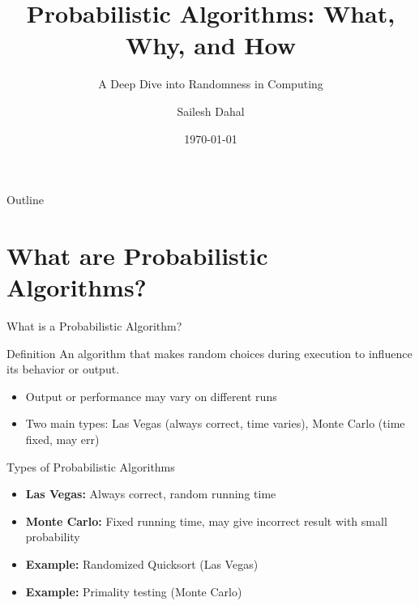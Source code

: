 \documentclass[aspectratio=169]{beamer}
\title{Probabilistic Algorithms: What, Why, and How}
\subtitle{A Deep Dive into Randomness in Computing}
\author{Sailesh Dahal}
\institute{Kathmandu University}
\date{\today}
\begin{document}
\begin{frame}
  \titlepage
\end{frame}

\begin{frame}{Outline}
  \tableofcontents
\end{frame}

\section{What are Probabilistic Algorithms?}
\begin{frame}{What is a Probabilistic Algorithm?}
  \begin{block}{Definition}
    An algorithm that makes random choices during execution to influence its behavior or output.
  \end{block}

  \begin{itemize}
    \item Output or performance may vary on different runs
    \item Two main types: Las Vegas (always correct, time varies), Monte Carlo (time fixed, may err)
  \end{itemize}
\end{frame}

\begin{frame}{Types of Probabilistic Algorithms}
  \begin{itemize}
    \item \textbf{Las Vegas:} Always correct, random running time

    \item \textbf{Monte Carlo:} Fixed running time, may give incorrect result with small probability

    \item \textbf{Example:} Randomized Quicksort (Las Vegas)

    \item \textbf{Example:} Primality testing (Monte Carlo)
  \end{itemize}
\end{frame}
\end{document}
